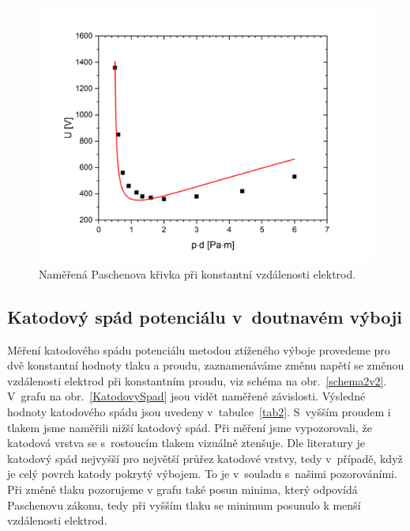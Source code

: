 \documentclass[a4paper,12pt]{article}
\begin{document}
\begin{figure}[h!]
	\centering
	\includegraphics[width=150mm]{dfixed.png}
	\caption{Naměřená Paschenova křivka při konstantní vzdálenosti elektrod.}
	\label{dfixed}
\end{figure}

\clearpage
\subsection{Katodový spád potenciálu v~doutnavém výboji}
Měření katodového spádu potenciálu metodou ztíženého výboje provedeme pro dvě konstantní hodnoty tlaku a proudu, 
zaznamenáváme změnu napětí se změnou vzdálenosti elektrod při konstantním 
proudu, viz schéma na obr.~\ref{schema2v2}. V~grafu na 
obr.~\ref{KatodovySpad} jsou vidět naměřené závislosti. Výsledné hodnoty 
katodového spádu jsou uvedeny v~tabulce~\ref{tab2}. S~vyšším proudem i tlakem
jsme naměřili nižší katodový spád. Při měření jsme vypozorovali, 
že katodová vrstva se s~rostoucím tlakem vizuálně ztenšuje. Dle literatury je 
katodový spád nejvyšší pro největší průřez katodové vrstvy, tedy v~případě, 
když je 
celý povrch katody pokrytý výbojem. To je v~souladu s~našimi pozorováními. 
Při změně tlaku pozorujeme v grafu také posun minima, který odpovídá Paschenovu 
zákonu, 
tedy při vyšším tlaku se minimum posunulo k menší vzdálenosti elektrod.  

	  

\end{document}
